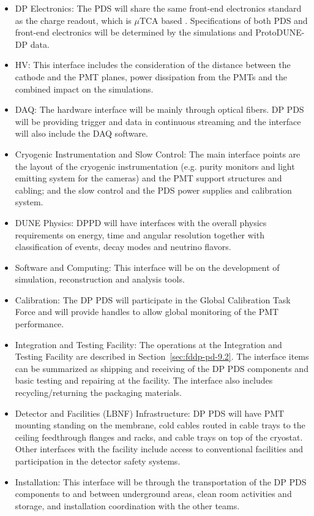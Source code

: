 \begin{itemize}

\item DP Electronics: The PDS will share the same front-end electronics standard as the charge readout, which is $\mu$TCA based \cite{utca}. Specifications of both PDS and front-end electronics will be determined by the simulations and ProtoDUNE-DP data.

\item HV: This interface includes the consideration of the distance between the cathode and the PMT planes, power dissipation from the PMTs and the combined impact on the simulations.

\item DAQ: The hardware interface will be mainly through optical fibers. DP PDS will be providing trigger and data in continuous streaming and the interface will also include the DAQ software.

\item Cryogenic Instrumentation and Slow Control: The main interface points are the layout of the cryogenic instrumentation (e.g. purity monitors and light emitting system for the cameras) and the PMT support structures and cabling; and the slow control and the PDS power supplies and calibration system.

\item DUNE Physics: DPPD will have interfaces with the overall physics requirements on energy, time and angular resolution together with classification of events, decay modes and neutrino flavors.

\item Software and Computing: This interface will be on the development of simulation, reconstruction and analysis tools.

\item Calibration: The DP PDS will participate in the Global Calibration Task Force and will provide handles to allow global monitoring of the PMT performance.

\item Integration and Testing Facility: The operations at the Integration and Testing Facility are described in Section~\ref{sec:fddp-pd-9.2}. The interface items can be summarized as shipping and receiving of the DP PDS components and basic testing and repairing at the facility. The interface also includes recycling/returning the packaging materials.

\item Detector and Facilities (LBNF) Infrastructure: DP PDS will have PMT mounting standing on the membrane, cold cables routed in cable trays to the ceiling feedthrough flanges and racks, and cable trays on top of the cryostat. Other interfaces with the facility include access to conventional facilities and participation in the detector safety systems. 

\item Installation: This interface will be through the transportation of the DP PDS components to and between underground areas, clean room activities and storage, and installation coordination with the other teams. 

\end{itemize}

